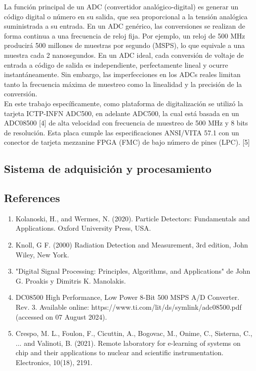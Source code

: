 \documentclass[]{book}
\begin{document}
\noindent La función principal de un ADC (convertidor analógico-digital) es generar un código digital o número en su salida, que sea proporcional a la tensión analógica suministrada a su entrada. En un ADC genérico, las conversiones se realizan de forma continua a una frecuencia de reloj fija. Por ejemplo, un reloj de 500 MHz producirá 500 millones de muestras por segundo (MSPS), lo que equivale a una muestra cada 2 nanosegundos. En un ADC ideal, cada conversión de voltaje de entrada a código de salida es independiente, perfectamente lineal y ocurre instantáneamente. Sin embargo, las imperfecciones en los ADCs reales limitan tanto la frecuencia máxima de muestreo como la linealidad y la precisión de la conversión. \\

\noindent En este trabajo específicamente, como plataforma de digitalización se utilizó la tarjeta ICTP-INFN ADC500, en adelante ADC500, la cual está basada en un ADC08500 [4] de alta velocidad con frecuencia de muestreo de 500 MHz y 8 bits de resolución. Esta placa cumple las especificaciones ANSI/VITA 57.1 con un conector de tarjeta mezzanine FPGA (FMC) de bajo número de pines (LPC). [5]




\subsection*{Sistema de adquisición y procesamiento}

\noindent 

\subsection*{References}
\begin{enumerate}

    \item Kolanoski, H., and Wermes, N. (2020). Particle Detectors: Fundamentals and Applications. Oxford University Press, USA.
    \item Knoll, G F. (2000) Radiation Detection and Measurement, 3rd edition, John Wiley, New
    York.
    \item "Digital Signal Processing: Principles, Algorithms, and Applications" de John G. Proakis y Dimitris K. Manolakis.
    \item DC08500 High Performance, Low Power 8-Bit 500 MSPS A/D Converter. Rev. 3. Available online: https://www.ti.com/lit/ds/symlink/adc08500.pdf (accessed on 07 August 2024).
    \item Crespo, M. L., Foulon, F., Cicuttin, A., Bogovac, M., Onime, C., Sisterna, C., ... and Valinoti, B. (2021). Remote laboratory for e-learning of systems on chip and their applications to nuclear and scientific instrumentation. Electronics, 10(18), 2191.
\end{enumerate}
\end{document}
